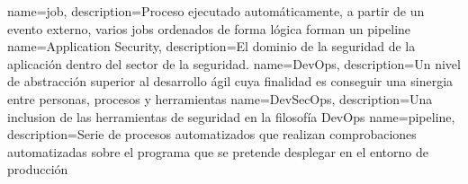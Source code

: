 {
    name=job,
    description={Proceso ejecutado automáticamente, a partir de un evento externo, varios jobs ordenados de forma lógica forman un pipeline}
}
{
        name=Application Security,
        description={El dominio de la seguridad de la aplicación dentro del 
        sector de la seguridad.}
}
{
        name=DevOps,
        description={Un nivel de abstracción superior al desarrollo ágil cuya
        finalidad es conseguir una sinergia entre personas, procesos y
        herramientas}
}
{
        name=DevSecOps,
        description={Una inclusion de las herramientas de seguridad en la
        filosofía DevOps}
}
{
        name=pipeline,
        description={Serie de procesos automatizados que realizan comprobaciones automatizadas sobre el programa que se pretende desplegar en el entorno de producción}
}

